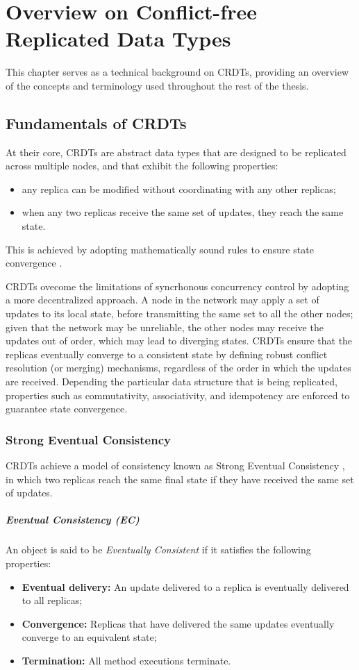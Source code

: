 \chapter{Overview on Conflict-free Replicated Data Types}

This chapter serves as a technical background on CRDTs, providing an overview of the concepts
and terminology used throughout the rest of the thesis.

\section{Fundamentals of CRDTs}
At their core, CRDTs are abstract data types that are designed to be replicated across multiple nodes,
and that exhibit the following properties:
\begin{itemize}
    \item any replica can be modified without coordinating with any other replicas;
    \item when any two replicas receive the same set of updates, they reach the same state.
\end{itemize}
This is achieved by adopting mathematically sound rules to ensure state convergence \cite{preguiça2018conflict}.

CRDTs ovecome the limitations of syncrhonous concurrency control by adopting a more decentralized approach.
A node in the network may apply a set of updates to its local state, before transmitting the same set to all
the other nodes; given that the network may be unreliable, the other nodes may receive the updates out of order,
which may lead to diverging states. CRDTs ensure that the replicas eventually converge to a consistent state by
defining robust conflict resolution (or merging) mechanisms, regardless of the order in which the updates are
received. Depending the particular data structure that is being replicated, properties such as commutativity,
associativity, and idempotency are enforced to guarantee state convergence.

\subsection{Strong Eventual Consistency}
CRDTs achieve a model of consistency known as Strong Eventual Consistency \cite{shapiro2011conflict}, in
which two replicas reach the same final state if they have received the same set of updates.

\paragraph{Eventual Consistency (EC)} An object is said to be \textit{Eventually Consistent} if it satisfies the
following properties:
\begin{itemize}
    \item \textbf{Eventual delivery:} An update delivered to a replica is eventually delivered to all replicas; 
    \item \textbf{Convergence:} Replicas that have delivered the same updates eventually converge to an equivalent state; 
    \item \textbf{Termination:} All method executions terminate. 
\end{itemize}

